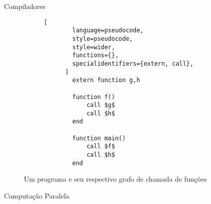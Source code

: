\begin{section}{Compiladores}
\begin{figure}[ht]
\begin{subfigure}[b]{0.40\textwidth}
\begin{center}
{
	}
	\end{center}
	\label{fig:call_graph}
  \end{subfigure}
  \begin{subfigure}[b]{0.40\textwidth}
	  \begin{lstlisting}[
		language=pseudocode,
		style=pseudocode,
		style=wider,
		functions={},
		specialidentifiers={extern, call},
	  ]
		extern function g,h

		function f()
			call $g$
			call $h$
		end

		function main()
			call $f$
			call $h$
		end
	  \end{lstlisting}
  \end{subfigure}
  \caption{Um programa e seu respectivo grafo de chamada de funções}
\end{figure}


\end{section}

\begin{section}{Computação Paralela}

\end{section}



